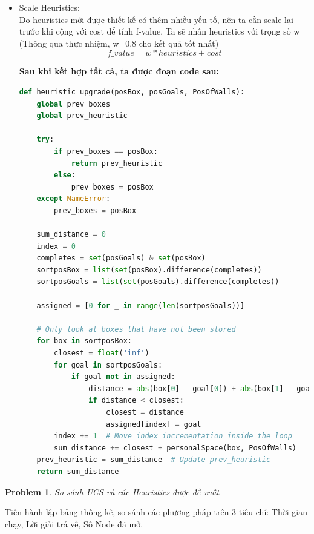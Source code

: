 \documentclass[12pt]{article}
\newtheorem{problem}{Problem}
\begin{document}
\begin{itemize}
	\item Scale Heuristics: \\
	Do heuristics mới được thiết kế có thêm nhiều yếu tố, nên ta cần scale lại trước khi cộng với cost để tính f-value. Ta sẽ nhân heuristics với trọng số w (Thông qua thực nhiệm, w=0.8 cho kết quả tốt nhất)
	{\large
	\begin{equation}
		f\_value = w*heuristics + cost
	\end{equation}}
	
	\newpage
	\noindent \hspace*{-1em}\textbf{
	Sau khi kết hợp tất cả, ta được đoạn code sau:}
  \begin{tcolorbox}[boxrule=0.5pt, colback=white]
  \begin{lstlisting}[language=python, numbers=none, basicstyle=\ttfamily\footnotesize]
def heuristic_upgrade(posBox, posGoals, PosOfWalls):
    global prev_boxes
    global prev_heuristic
    
    try:
        if prev_boxes == posBox:
            return prev_heuristic
        else:
            prev_boxes = posBox
    except NameError:
        prev_boxes = posBox

    sum_distance = 0
    index = 0
    completes = set(posGoals) & set(posBox)
    sortposBox = list(set(posBox).difference(completes))
    sortposGoals = list(set(posGoals).difference(completes))

    assigned = [0 for _ in range(len(sortposGoals))]

    # Only look at boxes that have not been stored
    for box in sortposBox:
        closest = float('inf') 
        for goal in sortposGoals:
            if goal not in assigned:
                distance = abs(box[0] - goal[0]) + abs(box[1] - goal[1])
                if distance < closest:
                    closest = distance
                    assigned[index] = goal
        index += 1  # Move index incrementation inside the loop
        sum_distance += closest + personalSpace(box, PosOfWalls)
    prev_heuristic = sum_distance  # Update prev_heuristic
    return sum_distance
  \end{lstlisting}
  \end{tcolorbox}
\end{itemize}


\newpage
\begin{problem}
	So sánh UCS và các Heuristics được đề xuất
\end{problem}
	Tiến hành lập bảng thống kê, so sánh các phương pháp trên 3 tiêu chí: Thời gian chạy, Lời giải trả về, Số Node đã mở. \\
\end{document}

